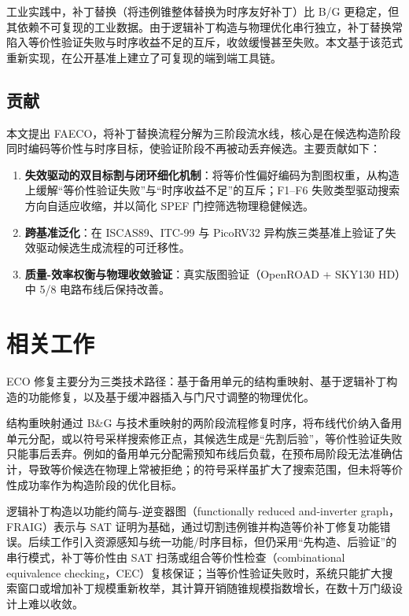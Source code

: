 \documentclass[journal]{IEEEtran}
\begin{document}
工业实践中，补丁替换（将违例锥整体替换为时序友好补丁）比 B/G 更稳定，但其依赖不可复现的工业数据。由于逻辑补丁构造与物理优化串行独立，补丁替换常陷入等价性验证失败与时序收益不足的互斥，收敛缓慢甚至失败。本文基于该范式重新实现，在公开基准上建立了可复现的端到端工具链。

\subsection{贡献}

本文提出 FAECO，将补丁替换流程分解为三阶段流水线，核心是在候选构造阶段同时编码等价性与时序目标，使验证阶段不再被动丢弃候选。主要贡献如下：

\begin{enumerate}
  \item \textbf{失效驱动的双目标割与闭环细化机制}：将等价性偏好编码为割图权重，从构造上缓解“等价性验证失败”与“时序收益不足”的互斥；F1--F6 失败类型驱动搜索方向自适应收缩，并以简化 SPEF 门控筛选物理稳健候选。
  \item \textbf{跨基准泛化}：在 ISCAS89、ITC-99 与 PicoRV32 异构族三类基准上验证了失效驱动候选生成流程的可迁移性。
  \item \textbf{质量-效率权衡与物理收敛验证}：真实版图验证（OpenROAD + SKY130 HD）中 5/8 电路布线后保持改善。
\end{enumerate}

\section{相关工作}

ECO 修复主要分为三类技术路径：基于备用单元的结构重映射、基于逻辑补丁构造的功能修复，以及基于缓冲器插入与门尺寸调整的物理优化。

结构重映射通过 B\&G 与技术重映射的两阶段流程修复时序，将布线代价纳入备用单元分配\cite{ho2010eco,ho2012treco}，或以符号采样搜索修正点\cite{kravets2019symbolic}，其候选生成是“先割后验”，等价性验证失败只能事后丢弃。例如\cite{ho2010eco}的备用单元分配需预知布线后负载，在预布局阶段无法准确估计，导致等价候选在物理上常被拒绝；\cite{kravets2019symbolic}的符号采样虽扩大了搜索范围，但未将等价性成功率作为构造阶段的优化目标。

逻辑补丁构造以功能约简与-逆变器图（functionally reduced and-inverter graph，FRAIG）表示与 SAT 证明为基础，通过切割违例锥并构造等价补丁修复功能错误\cite{jiang2010fraig,jiang2016resource}。后续工作引入资源感知\cite{jiang2016resource}与统一功能/时序目标\cite{lin2011simult,luo2016unified}，但仍采用“先构造、后验证”的串行模式，补丁等价性由 SAT 扫荡或组合等价性检查（combinational equivalence checking，CEC）复核保证\cite{mishchenko2006sat,zhong2024stp}；当等价性验证失败时，系统只能扩大搜索窗口或增加补丁规模重新枚举\cite{zhuo2018patch}，其计算开销随锥规模指数增长，在数十万门级设计上难以收敛。
\end{document}

